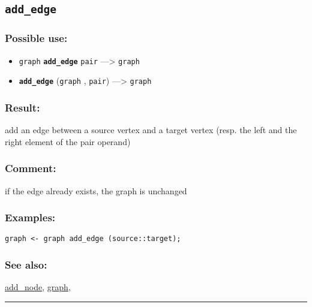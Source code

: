 \documentclass[]{book}
\providecommand{\tightlist}{%
  \setlength{\itemsep}{0pt}\setlength{\parskip}{0pt}}
\theoremstyle{definition}
\theoremstyle{definition}
\theoremstyle{definition}
\theoremstyle{remark}
\begin{document}
\subsection{\texorpdfstring{\texttt{add\_edge}}{add\_edge}}\label{add_edge}

\subsubsection{Possible use:}\label{possible-use-20}

\begin{itemize}
\tightlist
\item
  \texttt{graph} \textbf{\texttt{add\_edge}} \texttt{pair}
  ---\textgreater{} \texttt{graph}
\item
  \textbf{\texttt{add\_edge}} (\texttt{graph} , \texttt{pair})
  ---\textgreater{} \texttt{graph}
\end{itemize}

\subsubsection{Result:}\label{result-19}

add an edge between a source vertex and a target vertex (resp. the left
and the right element of the pair operand)

\subsubsection{Comment:}\label{comment-3}

if the edge already exists, the graph is unchanged

\subsubsection{Examples:}\label{examples-15}

\begin{verbatim}
graph <- graph add_edge (source::target); 
\end{verbatim}

\subsubsection{See also:}\label{see-also-16}

\href{OperatorsAA\#add_node}{add\_node},
\href{OperatorsDH\#graph}{graph},

\begin{center}\rule{0.5\linewidth}{\linethickness}\end{center}
\end{document}
